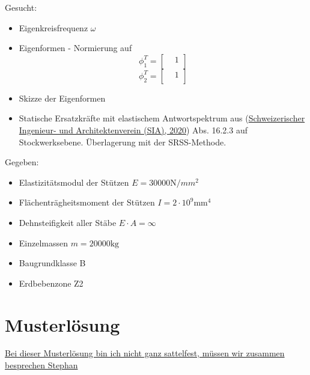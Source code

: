 \documentclass[
  letterpaper,
  DIV=11]{scrreprt}
\providecommand{\tightlist}{%
  \setlength{\itemsep}{0pt}\setlength{\parskip}{0pt}}\usepackage{longtable,booktabs,array}
\begin{document}
Gesucht:

\begin{itemize}
\item
  Eigenkreisfrequenz \(\omega\)
\item
  Eigenformen - Normierung auf \[\phi_1^T = 
  \begin{bmatrix}
   &  1\\
  \end{bmatrix} \] \[\phi_2^T =
  \begin{bmatrix}
   &  1\\
  \end{bmatrix}\]
\item
  Skizze der Eigenformen
\item
  Statische Ersatzkräfte mit elastischem Antwortspektrum aus
  (\protect\hyperlink{ref-SIA261_2020}{Schweizerischer Ingenieur- und
  Architektenverein (SIA), 2020}) Abs. 16.2.3 auf Stockwerksebene.
  Überlagerung mit der SRSS-Methode.
\end{itemize}

Gegeben:

\begin{itemize}
\tightlist
\item
  Elastizitätsmodul der Stützen \(E = 30000 \text{N}/{mm}^2\)
\item
  Flächenträgheitsmoment der Stützen \(I = 2 \cdot 10^9 \text{mm}^4\)
\item
  Dehnsteifigkeit aller Stäbe \(E\cdot A = \infty\)
\item
  Einzelmassen \(m = 20000 \text{kg}\)
\item
  Baugrundklasse B
\item
  Erdbebenzone Z2
\end{itemize}

\newpage{}

\hypertarget{musterluxf6sung-12}{%
\section{Musterlösung}\label{musterluxf6sung-12}}

\ul{Bei dieser Musterlösung bin ich nicht ganz sattelfest, müssen wir
zusammen besprechen Stephan}
\end{document}
